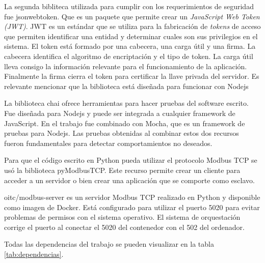 La segunda bibliteca utilizada para cumplir con los requerimientos de seguridad fue jsonwebtoken.
Que es un paquete que permite crear un \emph{JavaScript Web Token (JWT)}.
JWT es un estándar que se utiliza para la fabricación de \emph{tokens} de acceso que permiten identificar una entidad y determinar cuales son sus privilegios en el sistema.
El token está formado por una cabecera, una carga útil y una firma.
La cabecera identifica el algoritmo de encriptación y el tipo de token.
La carga útil lleva consigo la información relevante para el funcionamiento de la aplicación.
Finalmente la firma cierra el token para certificar la llave privada del servidor.
Es relevante mencionar que la biblioteca está diseñada para funcionar con Nodejs

La biblioteca chai ofrece herramientas para hacer pruebas del software escrito.
Fue diseñada para Nodejs y puede ser integrada a cualquier framework de JavaScript.
En el trabajo fue combinado con Mocha, que es un framework de pruebas para Nodejs.
Las pruebas obtenidas al combinar estos dos recursos fueron fundamentales para detectar comportamientos no deseados.

Para que el código escrito en Python pueda utilizar el protocolo Modbus TCP se usó la biblioteca pyModbusTCP.
Este recurso permite crear un cliente para acceder a un servidor o bien crear una aplicación que se comporte como esclavo.

oitc/modbus-server es un servidor Modbus TCP realizado en Python y disponible como imagen de Docker.
Está configurado para utilizar el puerto 5020 para evitar problemas de permisos con el sistema operativo. \citep{WEBSITE:dockerhubModbus}
El sistema de orquestación corrige el puerto al conectar el 5020 del contenedor con el 502 del ordenador.

Todas las dependencias del trabajo se pueden visualizar en la tabla \ref{tab:dependencias}.

